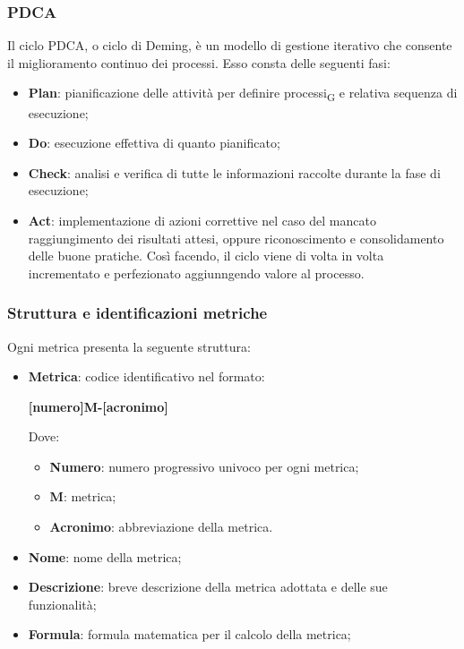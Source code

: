 \subsubsection{PDCA}
Il ciclo PDCA, o ciclo di Deming, è un modello di gestione iterativo che consente il miglioramento continuo dei processi. Esso consta delle seguenti fasi:
\begin{itemize}
    \item \textbf{Plan}: pianificazione delle attività per definire {processi\textsubscript{G}} e relativa sequenza di esecuzione;
    \item \textbf{Do}: esecuzione effettiva di quanto pianificato;
    \item \textbf{Check}: analisi e verifica di tutte le informazioni raccolte durante la fase di esecuzione;
    \item \textbf{Act}: implementazione di azioni correttive nel caso del mancato raggiungimento dei risultati attesi, oppure riconoscimento e 
    consolidamento delle buone pratiche. Così facendo, il ciclo viene di volta in volta incrementato e perfezionato aggiunngendo valore al processo.
\end{itemize}

\subsubsection{Struttura e identificazioni metriche}
Ogni metrica presenta la seguente struttura:
\begin{itemize}
    \item \textbf{Metrica}:
    codice identificativo nel formato:
    \begin{center}
        \textbf{[numero]M-[acronimo]}
    \end{center}
    Dove:
    \begin{itemize}
        \item \textbf{Numero}: numero progressivo univoco per ogni metrica;
        \item \textbf{M}: metrica;
        \item \textbf{Acronimo}: abbreviazione della metrica.
    \end{itemize}
    \item \textbf{Nome}: nome della metrica;
    \item \textbf{Descrizione}: breve descrizione della metrica adottata e delle sue funzionalità;
    \item \textbf{Formula}: formula matematica per il calcolo della metrica;
\end{itemize}

